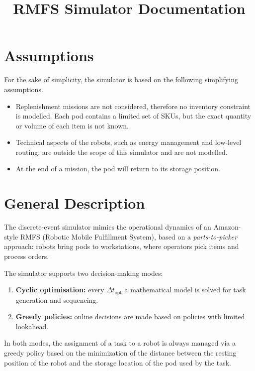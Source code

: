 \documentclass[a4paper,10pt]{article}
\title{\textbf{RMFS Simulator Documentation}}
\author{}
\date{}
\begin{document}
\maketitle
\tableofcontents
\newpage

\section{Assumptions}

For the sake of simplicity, the simulator is based on the following simplifying assumptions.

\begin{itemize}[noitemsep]
    \item Replenishment missions are not considered, therefore no inventory constraint is modelled. Each pod contains a limited set of SKUs, but the exact quantity or volume of each item is not known.
    \item Technical aspects of the robots, such as energy management and low-level routing, are outside the scope of this simulator and are not modelled.
    \item At the end of a mission, the pod will return to its storage position.
\end{itemize}

\section{General Description}
The discrete-event simulator mimics the operational dynamics of an Amazon-style RMFS (Robotic Mobile Fulfillment System), based on a \textit{parts-to-picker} approach: robots bring pods to workstations, where operators pick items and process orders.

The simulator supports two decision-making modes:
\begin{enumerate}[noitemsep]
    \item \textbf{Cyclic optimisation:} every $\Delta t_{\text{opt}}$ a mathematical model is solved for task generation and sequencing.
    \item \textbf{Greedy policies:} online decisions are made based on policies with limited lookahead.
\end{enumerate}

In both modes, the assignment of a task to a robot is always managed via a greedy policy based on the minimization of the distance between the resting position of the robot and the storage location of the pod used by the task.
\end{document}
